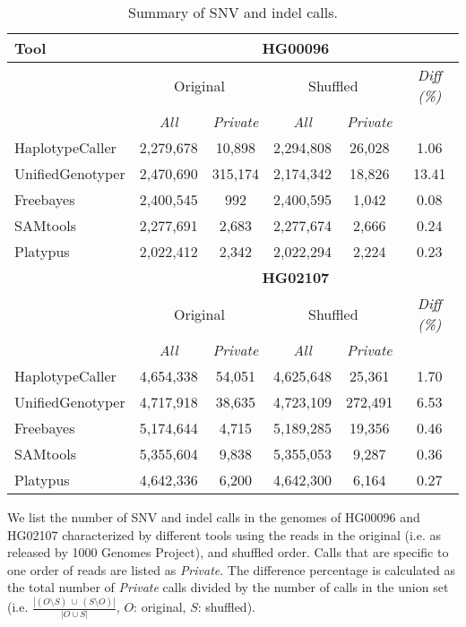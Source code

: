 \documentclass{bioinfo}
\begin{document}
\begin{methods}
\begin{table}[htb]
\caption{Summary of SNV and indel calls.}
\begin{center}
\begin{tabular}{|l|c|c||c|c||c|}
\hline
{\bf Tool} & \multicolumn{5}{|c|}{\bf HG00096} \\
\hline
{\bf } & \multicolumn{2}{c||}{Original} & \multicolumn{2}{c||}{Shuffled} & {\it Diff (\%) }\\
\cline{2-6}
{\bf } & {\it All } & {\it Private } & {\it All } & {\it Private } & {\it } \\
\hline
HaplotypeCaller & 2,279,678 & 10,898 & 2,294,808 & 26,028 & 1.06 \\
UnifiedGenotyper & 2,470,690 & 315,174 & 2,174,342 & 18,826 & 13.41 \\
Freebayes & 2,400,545 & 992 & 2,400,595 & 1,042 & 0.08 \\
SAMtools & 2,277,691 & 2,683 & 2,277,674 & 2,666 & 0.24 \\
Platypus & 2,022,412 & 2,342 & 2,022,294 & 2,224 & 0.23 \\
\hline
\hline
{\bf } & \multicolumn{5}{|c|}{\bf HG02107} \\
\hline
{\bf } & \multicolumn{2}{c||}{Original} & \multicolumn{2}{c||}{Shuffled} & {\it Diff (\%) }\\
\cline{2-6}
{\bf } & {\it All } & {\it Private } & {\it All } & {\it Private } & {\it } \\
\hline
HaplotypeCaller & 4,654,338 & 54,051 & 4,625,648 & 25,361 & 1.70 \\
UnifiedGenotyper & 4,717,918 & 38,635 & 4,723,109 & 272,491 & 6.53 \\
Freebayes & 5,174,644 & 4,715 & 5,189,285 & 19,356 & 0.46 \\
SAMtools & 5,355,604 & 9,838 & 5,355,053 & 9,287 & 0.36 \\
Platypus & 4,642,336 & 6,200 & 4,642,300 & 6,164 & 0.27 \\
\hline
\end{tabular}
\end{center}
{\footnotesize We list the number of SNV and indel calls in the genomes of HG00096 and HG02107 characterized by different tools using the reads in the original (i.e. as released by 1000 Genomes Project), and shuffled order.
Calls that are specific to one order of reads are listed as {\it Private}.
 The difference percentage is calculated as the total number of {\it Private} calls divided by the number of calls in the union set  (i.e. $\frac{|(O\setminus S)~\cup~ (S\setminus O)|}{|O\cup S|}$, $O$: original, $S$: shuffled). }
\label{tab:snps-orig-vs-shuf}
\end{table}



\end{methods}
\end{document}
